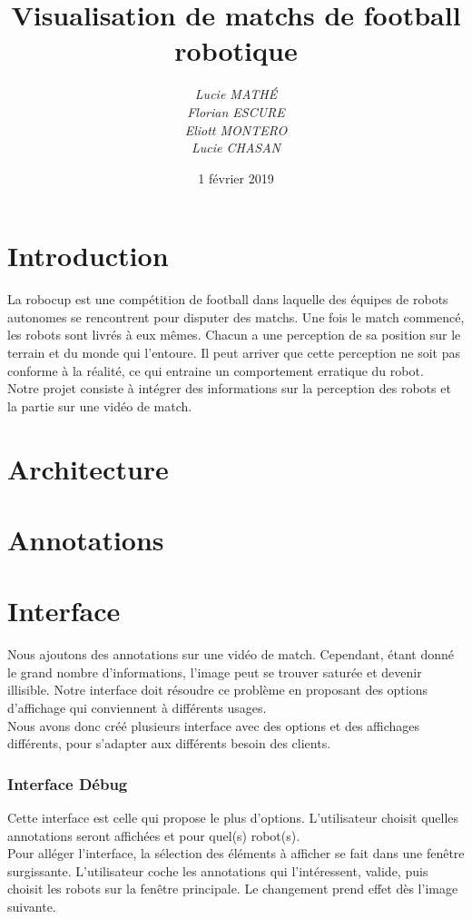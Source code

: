 \documentclass[a4paper,12pt]{report}
\title{Visualisation de matchs de football robotique}
\author{ 
\textit{Lucie MATHÉ}\\
\textit{Florian ESCURE}\\
\textit{Eliott MONTERO}\\
\textit{Lucie CHASAN}
}
\date{1\up{er} février 2019}
\begin{document}
\maketitle

\newpage
\chapter{Introduction}

La robocup est une compétition de football dans laquelle des équipes de robots autonomes se rencontrent pour disputer des matchs. Une fois le match commencé, les robots sont livrés à eux mêmes. Chacun a une perception de sa position sur le terrain et du monde qui l'entoure. Il peut arriver que cette perception ne soit pas conforme à la réalité, ce qui entraine un comportement erratique du robot. 
\\

Notre projet consiste à intégrer des informations sur la perception des robots et la partie sur une vidéo de match. 
\\

\chapter{Architecture}

\chapter{Annotations}


\chapter{Interface}
Nous ajoutons des annotations sur une vidéo de match. Cependant, étant donné le grand nombre d'informations, l'image peut se trouver saturée et devenir illisible. Notre interface doit résoudre ce problème en proposant des options d'affichage qui conviennent à différents usages.
\\

Nous avons donc créé plusieurs interface avec des options et des affichages différents, pour s'adapter aux différents besoin des clients.

\subsection{Interface Débug}
Cette interface est celle qui propose le plus d'options. L'utilisateur choisit quelles annotations seront affichées et pour quel(s) robot(s). 
\\

Pour alléger l'interface, la sélection des éléments à afficher se fait dans une fenêtre surgissante. L'utilisateur coche les annotations qui l'intéressent, valide, puis choisit les robots sur la fenêtre principale. Le changement prend effet dès l'image suivante.  
\end{document}
